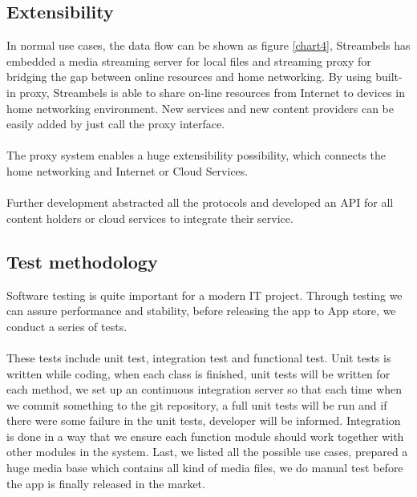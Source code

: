 \subsection{Extensibility}
In normal use cases, the data flow can be shown as figure \ref{chart4},
Streambels has embedded a media streaming server for local files and streaming
proxy for bridging the gap between online resources and home networking. By
using built-in proxy, Streambels is able to share on-line resources from
Internet to devices in home networking environment. New services and new
content providers can be easily added by just call the proxy interface.\\
\\
The proxy system enables a huge extensibility possibility, which connects the
home networking and Internet or Cloud Services.\\
\\
Further development abstracted all the protocols and developed an API for all
content holders or cloud services to integrate their service.

\subsection{Test methodology}
Software testing is quite important for a modern IT project. Through testing we
can assure performance and stability, before releasing the app to App store, we
conduct a series of tests.\\
\\
These tests include unit test, integration test and functional test.
Unit tests is written while coding, when each class is finished, unit tests will
be written for each method, we set up an continuous integration server so that
each time when we commit something to the git repository, a full unit tests will
be run and if there were some failure in the unit tests, developer will be
informed. Integration is done in a way that we ensure each function module
should work together with other modules in the system. Last, we listed all the
possible use cases, prepared a huge media base which contains all kind of media
files, we do manual test before the app is finally released in the market.

